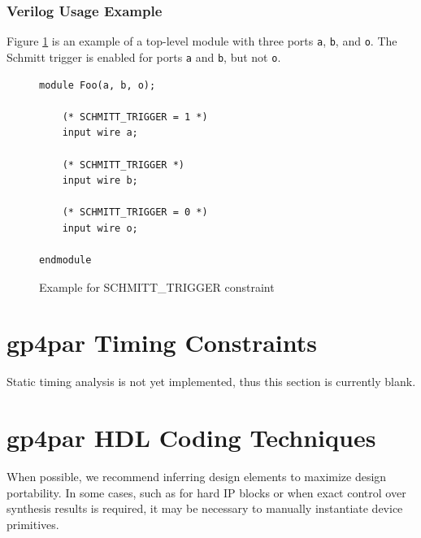 \documentclass{article}
\begin{document}
\subsubsection{Verilog Usage Example}

Figure \ref{constraint-schmitt} is an example of a top-level module with three ports \texttt{a}, \texttt{b}, and
\texttt{o}. The Schmitt trigger is enabled for ports  \texttt{a} and \texttt{b}, but not \texttt{o}.

\begin{figure}[h]
\begin{lstlisting}
module Foo(a, b, o);

	(* SCHMITT_TRIGGER = 1 *)
	input wire a;

	(* SCHMITT_TRIGGER *)
	input wire b;

	(* SCHMITT_TRIGGER = 0 *)
	input wire o;
	
endmodule
\end{lstlisting}
\caption{Example for SCHMITT\_TRIGGER constraint}
\label{constraint-schmitt}
\end{figure}


\pagebreak
\section{gp4par Timing Constraints}

Static timing analysis is not yet implemented, thus this section is currently blank.


\pagebreak
\section{gp4par HDL Coding Techniques}

When possible, we recommend inferring design elements to maximize design portability. In some cases, such as for hard 
IP blocks or when exact control over synthesis results is required, it may be necessary to manually instantiate device 
primitives.

\end{document}
